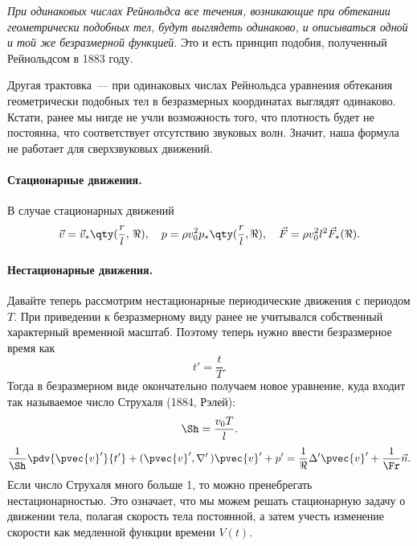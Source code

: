 \textit{При одинаковых числах Рейнольдса все течения, возникающие при обтекании геометрически подобных тел, будут выглядеть одинаково, и описываться одной и той же безразмерной функцией}. Это и есть принцип подобия, полученный Рейнольдсом в 1883 году.

Другая трактовка~--- при одинаковых числах Рейнольдса уравнения обтекания геометрически подобных тел в безразмерных координатах выглядят одинаково.
Кстати, ранее мы нигде не учли возможность того, что плотность будет не постоянна, что соответствует отсутствию звуковых волн. Значит, наша формула не работает для сверхзвуковых движений.

\paragraph{Стационарные движения. } В случае стационарных движений
\begin{equation}
	\label{eq:zamech1}
    \vec{v}=\vec{v}_* \qty(\frac{r}{l},\, \Re), \quad
    p = \rho v_0^2 p_* \qty(\frac{r}{l}, \Re), \quad
    \vec{F} = \rho v_0^2 l^2 \vec{F}_* (\Re).
\end{equation}

\paragraph{Нестационарные движения. } Давайте теперь рассмотрим нестационарные периодические движения с периодом $T$. При приведении к безразмерному виду ранее не  учитывался собственный характерный временной масштаб. Поэтому теперь нужно ввести безразмерное время как
\begin{equation}
    t'=\frac{t}{T}.
\end{equation}
Тогда в безразмерном виде окончательно получаем новое уравнение, куда входит так называемое число Струхаля (1884, Рэлей):
\begin{equation}
    \Sh = \frac{v_0 T}{l}.
\end{equation}
\begin{equation}
    \frac{1}{\Sh}\pdv{\pvec{v}'}{t'}+(\pvec{v}', \nabla'\,)\pvec{v}' + p'=
    \frac{1}{\Re}\Delta' \pvec{v}' + \frac{1}{\Fr} \vec{n}.
\end{equation}
Если число Струхаля много больше 1, то можно пренебрегать нестационарностью. Это означает, что мы можем решать стационарную задачу о движении тела, полагая скорость тела постоянной, а затем учесть изменение скорости как медленной функции времени  $V(t)$.

